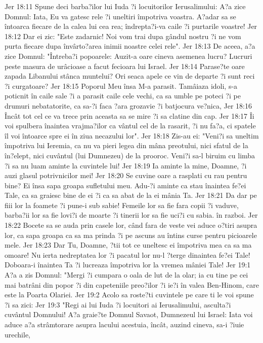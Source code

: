 Jer 18:11  Spune deci barba?ilor lui Iuda ?i locuitorilor Ierusalimului: A?a zice Domnul: Iata, Eu va gatesc rele ?i uneltiri împotriva voastra. A?adar sa se întoarca fiecare de la calea lui cea rea; îndrepta?i-va caile ?i purtarile voastre!
Jer 18:12  Dar ei zic: "Este zadarnic! Noi vom trai dupa gândul nostru ?i ne vom purta fiecare dupa învârto?area inimii noastre celei rele".
Jer 18:13  De aceea, a?a zice Domnul: "Întreba?i popoarele: Auzit-a oare cineva asemenea lucru? Lucruri peste masura de urâcioase a facut fecioara lui Israel.
Jer 18:14  Parase?te oare zapada Libanului stânca muntelui? Ori seaca apele ce vin de departe ?i sunt reci ?i curgatoare?
Jer 18:15  Poporul Meu însa M-a parasit. Tamâiaza idoli, s-a poticnit în caile sale ?i a parasit caile cele vechi, ca sa umble pe poteci ?i pe drumuri nebatatorite, ca sa-?i faca ?ara grozavie ?i batjocura ve?nica,
Jer 18:16  Încât tot cel ce va trece prin aceasta sa se mire ?i sa clatine din cap.
Jer 18:17  Îi voi spulbera înaintea vrajma?ilor ca vântul cel de la rasarit, ?i nu fa?a, ci spatele îl voi întoarce spre ei în ziua necazului lor".
Jer 18:18  Zis-au ei: "Veni?i sa uneltim împotriva lui Ieremia, ca nu va pieri legea din mâna preotului, nici sfatul de la în?elept, nici cuvântul (lui Dumnezeu) de la prooroc. Veni?i sa-l biruim cu limba ?i sa nu luam aminte la cuvintele lui!
Jer 18:19  Ia aminte la mine, Doamne, ?i auzi glasul potrivnicilor mei!
Jer 18:20  Se cuvine oare a rasplati cu rau pentru bine? Ei însa sapa groapa sufletului meu. Adu-?i aminte ca stau înaintea fe?ei Tale, ca sa graiesc bine de ei ?i ca sa abat de la ei mânia Ta.
Jer 18:21  Da dar pe fiii lor la foamete ?i pune-i sub sabie! Femeile lor sa fie fara copii ?i vaduve, barba?ii lor sa fie lovi?i de moarte ?i tinerii lor sa fie uci?i cu sabia. în razboi.
Jer 18:22  Bocete sa se auda prin casele lor, când fara de veste vei aduce o?tiri asupra lor, ca sapa groapa ca sa ma prinda ?i pe ascuns au întins curse pentru picioarele mele.
Jer 18:23  Dar Tu, Doamne, ?tii tot ce uneltesc ei împotriva mea ca sa ma omoare! Nu ierta nedreptatea lor ?i pacatul lor nu-l ?terge dinaintea fe?ei Tale! Doboara-i înaintea Ta ?i lucreaza împotriva lor la vremea mâniei Tale!
Jer 19:1  A?a a zis Domnul: "Mergi ?i cumpara o oala de lut de la olar; ia cu tine pe cei mai batrâni din popor ?i din capeteniile preo?ilor ?i ie?i în valea Ben-Hinom, care este la Poarta Olariei.
Jer 19:2  Acolo sa roste?ti cuvintele pe care ti le voi spune ?i sa zici:
Jer 19:3  "Regi ai lui Iuda ?i locuitori ai Ierusalimului, asculta?i cuvântul Domnului! A?a graie?te Domnul Savaot, Dumnezeul lui Israel: Iata voi aduce a?a strâmtorare asupra lacului acestuia, încât, auzind cineva, sa-i ?iuie urechile,
